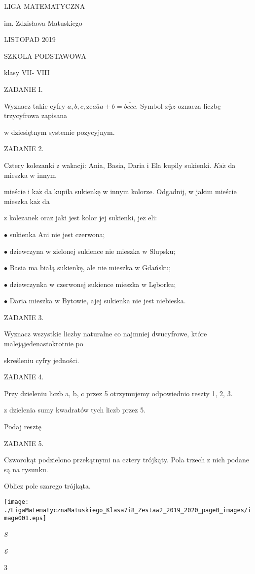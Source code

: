 \documentclass[a4paper,12pt]{article}
\begin{document}
LIGA MATEMATYCZNA

im. Zdzisława Matuskiego

LISTOPAD 2019

SZKOLA PODSTAWOWA

klasy VII- VIII

ZADANIE I.

Wyznacz takie cyfry $a, b, c, \dot{\mathrm{z}}\mathrm{e}\overline{aaa}+b=\overline{bccc}$. Symbol $\overline{xyz}$ oznacza liczbę trzycyfrowa zapisana

w dziesiętnym systemie pozycyjnym.

ZADANIE 2.

Cztery kolezanki z wakacji: Ania, Basia, Daria i Ela kupily sukienki. $K\mathrm{a}\dot{\mathrm{z}}$ da mieszka w innym

mieście i $\mathrm{k}\mathrm{a}\dot{\mathrm{z}}$ da kupila sukienkę w innym kolorze. Odgadnij, w jakim mieście mieszka $\mathrm{k}\mathrm{a}\dot{\mathrm{z}}$ da

z kolezanek oraz jaki jest kolor jej sukienki, $\mathrm{j}\mathrm{e}\dot{\mathrm{z}}$ eli:

$\bullet$ sukienka Ani nie jest czerwona;

$\bullet$ dziewczyna w zielonej sukience nie mieszka w Slupsku;

$\bullet$ Basia ma białą sukienkę, ale nie mieszka w Gdańsku;

$\bullet$ dziewczynka w czerwonej sukience mieszka w Lęborku;

$\bullet$ Daria mieszka w Bytowie, ajej sukienka nie jest niebieska.

ZADANIE 3.

Wyznacz wszystkie liczby naturalne co najmniej dwucyfrowe, które malejąjedenastokrotnie po

skreśleniu cyfry jedności.

ZADANIE 4.

Przy dzieleniu liczb a, b, c przez 5 otrzymujemy odpowiednio reszty 1, 2, 3.

z dzielenia sumy kwadratów tych liczb przez 5.

Podaj resztę

ZADANIE 5.

Czworokąt podzielono przekątnymi na cztery trójkąty. Pola trzech z nich podane są na rysunku.

Oblicz pole szarego trójkąta.
\begin{center}
\texttt{[image: ./LigaMatematycznaMatuskiego\_Klasa7i8\_Zestaw2\_2019\_2020\_page0\_images/image001.eps]}
\end{center}
{\it 8}

{\it 6}

3
\end{document}
